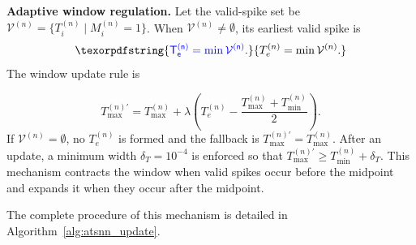 \documentclass[12pt]{article}
\providecommand{\DIFaddtex}[1]{{\protect\color{blue}\sf #1}}
\providecommand{\DIFadd}[1]{\texorpdfstring{\DIFaddtex{#1}}{#1}}
\providecommand{\DIFaddbegin}{}
\providecommand{\DIFaddend}{}
\begin{document}
 \textbf{Adaptive window regulation.}
 \DIFaddbegin \DIFadd{Let the valid-spike set be $\mathcal{V}^{(n)}=\{T_i^{(n)}\mid M_i^{(n)}=1\}$. When $\mathcal{V}^{(n)}\neq\emptyset$, its }\DIFaddend earliest valid spike  \DIFaddbegin \DIFadd{is
}\[
\DIFadd{T_e^{(n)}=\min \mathcal{V}^{(n)}.
}\]\DIFaddend 
 The window update rule is

\begin{equation}
T_{\max}^{(n)\prime} =
T_{\max}^{(n)}
+
\lambda
\left(
T_e^{(n)} -
\frac{T_{\max}^{(n)}+T_{\min}^{(n)}}{2}
\right).
\label{eq:supp_window_update}
\end{equation}
 \DIFaddbegin \DIFadd{If $\mathcal{V}^{(n)}=\emptyset$, no $T_e^{(n)}$ is formed and the fallback is $T_{\max}^{(n)\prime}=T_{\max}^{(n)}$. After an update, a minimum width $\delta_T=10^{-4}$ is enforced so that $T_{\max}^{(n)\prime}\ge T_{\min}^{(n)}+\delta_T$. This mechanism contracts the window }\DIFaddend when \DIFaddbegin \DIFadd{valid spikes occur before the midpoint and expands it when }\DIFaddend they occur  \DIFaddbegin \DIFadd{after the midpoint.
}

\DIFaddend The complete procedure of this mechanism is detailed in Algorithm~\ref{alg:atsnn_update}.
\end{document}
